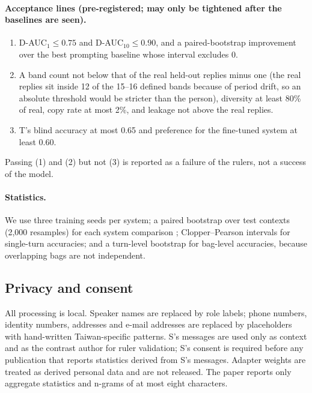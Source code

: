 \paragraph{Acceptance lines (pre-registered; may only be tightened after the baselines are seen).}
\begin{enumerate}
\item D-AUC$_1 \le 0.75$ and D-AUC$_{10} \le 0.90$, and a paired-bootstrap improvement over the best prompting baseline whose interval excludes 0.
\item A band count not below that of the real held-out replies minus one (the real replies sit inside 12 of the 15--16 defined bands because of period drift, so an absolute threshold would be stricter than the person), diversity at least 80\% of real, copy rate at most 2\%, and leakage not above the real replies.
\item T's blind accuracy at most 0.65 and preference for the fine-tuned system at least 0.60.
\end{enumerate}
Passing (1) and (2) but not (3) is reported as a failure of the rulers, not a success of the model.

\paragraph{Statistics.}
We use three training seeds per system; a paired bootstrap over test contexts (2,000 resamples) for each system comparison \citep{bergkirkpatrick2012empirical}; Clopper--Pearson intervals for single-turn accuracies; and a turn-level bootstrap for bag-level accuracies, because overlapping bags are not independent.

\subsection{Privacy and consent}
\label{sec:privacy}

All processing is local.
Speaker names are replaced by role labels; phone numbers, identity numbers, addresses and e-mail addresses are replaced by placeholders with hand-written Taiwan-specific patterns.
S's messages are used only as context and as the contrast author for ruler validation; S's consent is required before any publication that reports statistics derived from S's messages.
Adapter weights are treated as derived personal data and are not released.
The paper reports only aggregate statistics and n-grams of at most eight characters.

